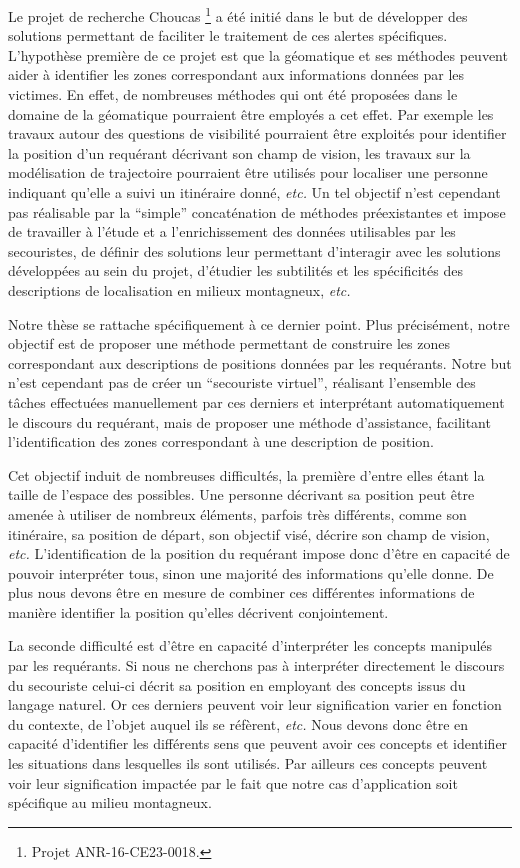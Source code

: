 Le projet de recherche Choucas \footnote{Projet ANR-16-CE23-0018.} a
été initié dans le but de développer des solutions permettant de
faciliter le traitement de ces alertes spécifiques. L'hypothèse
première de ce projet est que la géomatique et ses méthodes peuvent
aider à identifier les zones correspondant aux informations données
par les victimes. En effet, de nombreuses méthodes qui ont été
proposées dans le domaine de la géomatique pourraient être employés a
cet effet. Par exemple les travaux autour des questions de visibilité
pourraient être exploités pour identifier la position d'un requérant
décrivant son champ de vision, les travaux sur la modélisation de
trajectoire pourraient être utilisés pour localiser une personne
indiquant qu'elle a suivi un itinéraire donné, \emph{etc.} Un tel
objectif n'est cependant pas réalisable par la \enquote{simple}
concaténation de méthodes préexistantes et impose de travailler à
l'étude et a l’enrichissement des données utilisables par les
secouristes, de définir des solutions leur permettant d’interagir avec
les solutions développées au sein du projet, d'étudier les subtilités
et les spécificités des descriptions de localisation en milieux
montagneux, \emph{etc.}

Notre thèse se rattache spécifiquement à ce dernier point. Plus
précisément, notre objectif est de proposer une méthode permettant de
construire les zones correspondant aux descriptions de positions
données par les requérants. Notre but n'est cependant pas de créer un
\enquote{secouriste virtuel}, réalisant l'ensemble des tâches
effectuées manuellement par ces derniers et interprétant
automatiquement le discours du requérant, mais de proposer une méthode
d'assistance, facilitant l'identification des zones correspondant à
une description de position.

Cet objectif induit de nombreuses difficultés, la première d'entre
elles étant la taille de l'espace des possibles. Une personne
décrivant sa position peut être amenée à utiliser de nombreux
éléments, parfois très différents, comme son itinéraire, sa position
de départ, son objectif visé, décrire son champ de vision, \emph{etc.}
L'identification de la position du requérant impose donc d'être en
capacité de pouvoir interpréter tous, sinon une majorité des
informations qu'elle donne. De plus nous devons être en mesure de
combiner ces différentes informations de manière identifier la
position qu'elles décrivent conjointement.

La seconde difficulté est d'être en capacité d'interpréter les
concepts manipulés par les requérants. Si nous ne cherchons pas à
interpréter directement le discours du secouriste celui-ci décrit sa
position en employant des concepts issus du langage naturel. Or ces
derniers peuvent voir leur signification varier en fonction du
contexte, de l'objet auquel ils se réfèrent, \emph{etc.}
Nous devons donc être en capacité
d'identifier les différents sens que peuvent avoir ces concepts et
identifier les situations dans lesquelles ils sont utilisés. Par
ailleurs ces concepts peuvent voir leur signification impactée par le
fait que notre cas d’application soit spécifique au milieu montagneux.

